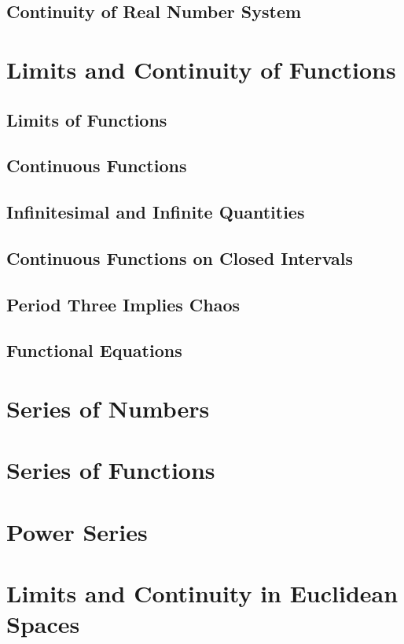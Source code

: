 \documentclass[11pt]{elegantbook}
\begin{document}
\section{Continuity of Real Number System}

\chapter{Limits and Continuity of Functions}
\section{Limits of Functions}

\section{Continuous Functions}

\section{Infinitesimal and Infinite Quantities}

\section{Continuous Functions on Closed Intervals}

\section{Period Three Implies Chaos}

\section{Functional Equations}

\chapter{Series of Numbers}

\chapter{Series of Functions}

\chapter{Power Series}

\chapter{Limits and Continuity in Euclidean Spaces}
\end{document}
